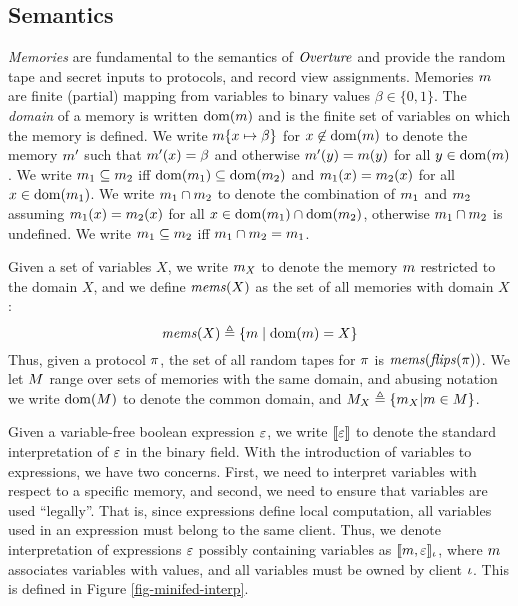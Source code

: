 \subsection{Semantics}

\emph{Memories} are fundamental to the semantics of $\mathit{Overture}$ and
provide the random tape and secret inputs to protocols, and record
view assignments. Memories $m$ are finite (partial) mapping from
variables to binary values $\beta \in \{0,1\}$. The \emph{domain} of a
memory is written $\mathrm{dom}(m)$ and is the finite set of variables on
which the memory is defined. We write $m\{ x \mapsto \beta\}$ for
$x\not\in\mathrm{dom}(m)$ to denote the memory $m'$ such that
$m'(x) = \beta$ and otherwise $m'(y) = m(y)$ for all $y
\in \mathrm{dom}(m)$. We write $m_1 \subseteq m_2$ iff
$\mathrm{dom}(m_1) \subseteq \mathrm{dom}(m_2)$ and $m_1(x) =
m_2(x)$ for all $x \in \mathrm{dom}(m_1)$. We write $m_1 \cap
m_2$ to denote the combination of $m_1$ and $m_2$
assuming $m_1(x) = m_2(x)$ for all $x \in \mathrm{dom}(m_1)
\cap \mathrm{dom}(m_2)$, otherwise $m_1 \cap m_2$ is undefined.
We write $m_1 \subseteq m_2$ iff $m_1 \cap m_2
= m_1$.

Given a set of variables $X$, we write $m_X$ to denote the
memory $m$ restricted to the domain $X$, and we define
$\mathit{mems}(X)$ as the set of all memories with domain $X$:
$$
\mathit{mems}(X) \triangleq \{ m \mid \mathrm{dom}(m) = X \}
$$
Thus, given a protocol $\pi$, the set of all random tapes for
$\pi$ is $\mathit{mems}(\mathit{flips}(\pi))$. We let $M$ range
over sets of memories with the same domain, and abusing notation
we write $\mathrm{dom}(M)$ to denote the common domain,
and $M_X \triangleq \{ m_X | m \in M \}$.

Given a variable-free boolean expression $\varepsilon$, we write $\llbracket \varepsilon \rrbracket$
to denote the standard interpretation of $\varepsilon$ in the binary field.
With the introduction of variables to expressions, we have two
concerns. First, we need to interpret variables with respect to a
specific memory, and second, we need to ensure that variables are used
``legally''. That is, since expressions define local computation, all
variables used in an expression must belong to the same client.  Thus,
we denote interpretation of expressions $\varepsilon$ possibly containing
variables as $\llbracket m,\varepsilon \rrbracket_{\iota}$, where $m$ associates
variables with values, and all variables must be owned by client
$\iota$. This is defined in Figure \ref{fig-minifed-interp}.

